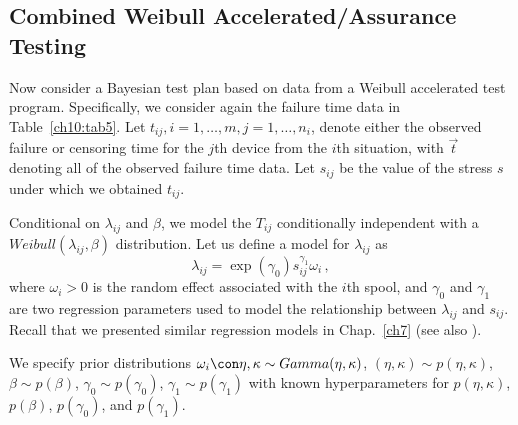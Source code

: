 \documentclass {book}
\begin{document}
\subsection{Combined Weibull Accelerated/Assurance
Testing}\label{ch10:sec4:ss2} Now consider a Bayesian
test plan based on data from a Weibull accelerated test
program.
Specifically, we consider again the failure time data in
Table~\ref{ch10:tab5}. Let $t_{ij}, i = 1, \ldots, m, j = 1,
\ldots, n_{i}$, denote either the observed failure or censoring
time for the $j$th device from the $i$th situation, with $\vec{t}$
denoting all of the observed failure time data. Let $s_{ij}$ be
the value of the stress $s$ under which we obtained $t_{ij}$.

Conditional on $\lambda_{ij}$ and $\beta$, we model the $T_{ij}$
conditionally independent with a $Weibull(\lambda_{ij}, \beta)$
distribution. Let us define a model for $\lambda_{ij}$ as
\begin{equation}\label{ch10:eqn23}
\lambda_{ij} = \exp(\gamma_{0})s_{ij}^{\gamma_{1}}\omega_{i} \, ,
\end{equation}
where $\omega_{i} > 0$ is the random effect associated with the
$i$th spool, and $\gamma_{0}$ and $\gamma_{1}$ are two regression
parameters used to model the relationship between $\lambda_{ij}$
and $s_{ij}$. Recall that we presented similar regression models
in Chap.~\ref{ch7} (see also \citet{LRAT07}).

We specify prior distributions $\omega_{i} \con \eta, \kappa \sim
Gamma(\eta, \kappa)$, $(\eta, \kappa) \sim p(\eta, \kappa)$,
$\beta \sim p(\beta)$, $\gamma_{0} \sim p(\gamma_{0})$,
$\gamma_{1} \sim p(\gamma_{1})$ with known hyperparameters for
$p(\eta, \kappa)$, $p(\beta)$, $p(\gamma_{0})$, and
$p(\gamma_{1})$.
\end{document}
